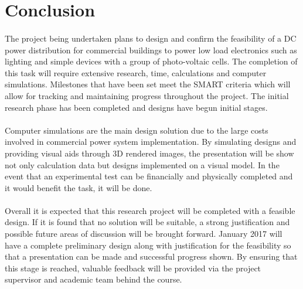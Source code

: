 \section{Conclusion}

\paragraph{}
The project being undertaken plans to design and confirm the feasibility of a DC power distribution for commercial buildings to power low load electronics such as lighting and simple devices with a group of photo-voltaic cells. The completion of this task will require extensive research, time, calculations and computer simulations. Milestones that have been set meet the SMART criteria which will allow for tracking and maintaining progress throughout the project. The initial research phase has been completed and designs have begun initial stages.

\paragraph{}
Computer simulations are the main design solution due to the large costs involved in commercial power system implementation. By simulating designs and providing visual aids through 3D rendered images, the presentation will be show not only calculation data but designs implemented on a visual model. In the event that an experimental test can be financially and physically completed and it would benefit the task, it will be done.    

\paragraph{}
Overall it is expected that this research project will be completed with a feasible design. If it is found that no solution will be suitable, a strong justification and possible future areas of discussion will be brought forward. January 2017 will have a complete preliminary design along with justification for the feasibility so that a presentation can be made and successful progress shown. By ensuring that this stage is reached, valuable feedback will be provided via the project supervisor and academic team behind the course. 
\newpage